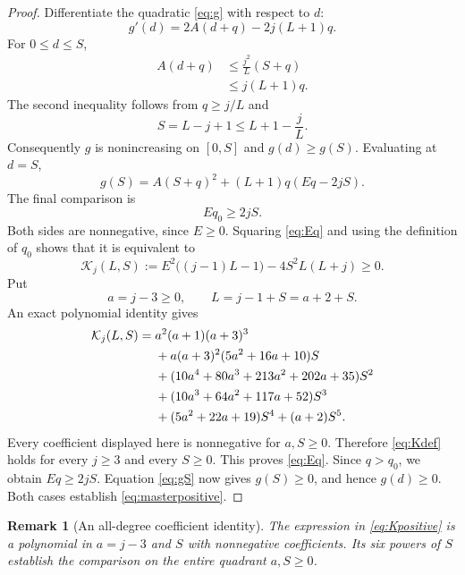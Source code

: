 \documentclass[11pt,a4paper]{article}
\newtheorem{remark}[theorem]{Remark}
\begin{document}
\begin{proof}
Differentiate the quadratic \eqref{eq:g} with respect to $d$:
\[
 g'(d)=2A(d+q)-2j(L+1)q.
\]
For $0\le d\le S$,
\begin{align*}
 A(d+q)&\le \frac{j^2}{L}(S+q)\\
 &\le j(L+1)q.
\end{align*}
The second inequality follows from $q\ge j/L$ and
\[
 S=L-j+1\le L+1-\frac jL.
\]
Consequently $g$ is nonincreasing on $[0,S]$ and $g(d)\ge g(S)$. Evaluating at $d=S$,
\begin{equation}\label{eq:gS}
 g(S)=A(S+q)^2+(L+1)q(Eq-2jS).
\end{equation}
The final comparison is
\begin{equation}\label{eq:Eq}
 Eq_0\ge2jS.
\end{equation}
Both sides are nonnegative, since $E\ge0$. Squaring \eqref{eq:Eq} and using the definition of $q_0$ shows that it is equivalent to
\begin{equation}\label{eq:Kdef}
 \mathcal K_j(L,S):=
 E^2\bigl((j-1)L-1\bigr)-4S^2L(L+j)\ge0.
\end{equation}
Put
\[
 a=j-3\ge0,\qquad L=j-1+S=a+2+S.
\]
An exact polynomial identity gives
\begin{align}\label{eq:Kpositive}
 \mathcal K_j(L,S)={}&a^2(a+1)(a+3)^3\\
 &+a(a+3)^2(5a^2+16a+10)S\notag\\
 &+(10a^4+80a^3+213a^2+202a+35)S^2\notag\\
 &+(10a^3+64a^2+117a+52)S^3\notag\\
 &+(5a^2+22a+19)S^4+(a+2)S^5.\notag
\end{align}
Every coefficient displayed here is nonnegative for $a,S\ge0$. Therefore \eqref{eq:Kdef} holds for every $j\ge3$ and every $S\ge0$. This proves \eqref{eq:Eq}. Since $q>q_0$, we obtain $Eq\ge2jS$. Equation \eqref{eq:gS} now gives $g(S)\ge0$, and hence $g(d)\ge0$. Both cases establish \eqref{eq:masterpositive}.
\end{proof}

\begin{remark}[An all-degree coefficient identity]
The expression in \eqref{eq:Kpositive} is a polynomial in $a=j-3$ and $S$ with nonnegative coefficients. Its six powers of $S$ establish the comparison on the entire quadrant $a,S\ge0$.
\end{remark}
\end{document}
